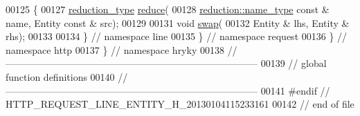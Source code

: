 \begin{DoxyCode}
00125 \{
00127     \hyperlink{namespacehryky_a343a9a4c36a586be5c2693156200eadc}{reduction_type} \hyperlink{namespacehryky_1_1http_a08fc36a78a8e2908140fcd102829a566}{reduce}(
00128         \hyperlink{namespacehryky_1_1reduction_ac686c30a4c8d196bbd0f05629a6b921f}{reduction::name_type} \textcolor{keyword}{const} & name, Entity \textcolor{keyword}{const} & src);
00129 
00131     \textcolor{keywordtype}{void} \hyperlink{namespacehryky_1_1http_a38e62595ad532d18fbc65ceb61973aec}{swap}(
00132         Entity & lhs, Entity & rhs);
00133 
00134 \} \textcolor{comment}{// namespace line}
00135 \} \textcolor{comment}{// namespace request}
00136 \} \textcolor{comment}{// namespace http}
00137 \} \textcolor{comment}{// namespace hryky}
00138 \textcolor{comment}{//
      ------------------------------------------------------------------------------}
00139 \textcolor{comment}{// global function definitions}
00140 \textcolor{comment}{//
      ------------------------------------------------------------------------------}
00141 \textcolor{preprocessor}{#endif // HTTP\_REQUEST\_LINE\_ENTITY\_H\_20130104115233161}
00142 \textcolor{preprocessor}{}\textcolor{comment}{// end of file}
\end{DoxyCode}
